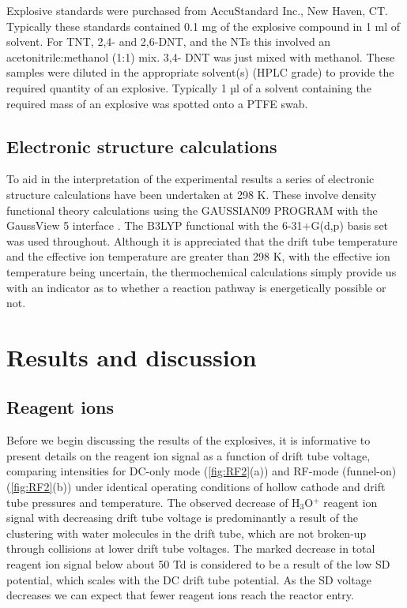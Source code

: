 Explosive standards were purchased from AccuStandard Inc., New Haven, CT.
Typically these standards contained 0.1 mg of the explosive compound in 1 ml of solvent. For TNT, 2,4- and 2,6-DNT, and the NTs this involved an acetonitrile:methanol (1:1) mix. 3,4- DNT was just mixed with methanol. These samples were diluted in the appropriate solvent(s) (HPLC grade) to provide the required quantity of an explosive. Typically 1 µl of a solvent containing the required mass of an explosive was spotted onto a PTFE swab.















\subsection{Electronic structure calculations}
To aid in the interpretation of the experimental results a series of electronic structure calculations have been undertaken at 298 K. These involve density functional theory calculations using the GAUSSIAN09 PROGRAM with the GaussView 5 interface \cite{frisch2009gaussian}. The B3LYP functional with the 6-31+G(d,p) basis set was used throughout. Although it is appreciated that the drift tube temperature and the effective ion temperature are greater than 298 K, with the effective ion temperature being uncertain, the thermochemical calculations simply provide us with an indicator as to whether a reaction pathway is energetically possible or not.
















\section{Results and discussion}

\subsection{Reagent ions}
Before we begin discussing the results of the explosives, it is informative to present details on the reagent ion signal as a function of drift tube voltage, comparing intensities for DC-only mode (\autoref{fig:RF2}(a)) and RF-mode (funnel-on) (\autoref{fig:RF2}(b)) under identical operating conditions of hollow cathode and drift tube pressures and temperature. The observed decrease of H$_3$O$^+$ reagent ion signal with decreasing drift tube voltage is predominantly a result of the clustering with water molecules in the drift tube, which are not broken-up through collisions at lower drift tube voltages. The marked decrease in total reagent ion signal below about 50 Td is considered to be a result of the low SD potential, which scales with the DC drift tube potential. As the SD voltage decreases we can expect that fewer reagent ions reach the reactor entry.

